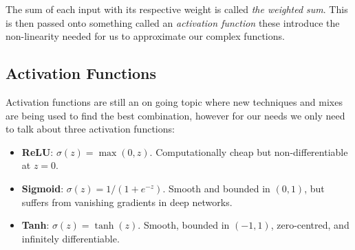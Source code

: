 \documentclass[12pt, a4paper]{article}
\begin{document}
The sum of each input with its respective weight is called \emph{the weighted sum}. This is then passed onto something called an \emph{activation function} these introduce the non-linearity needed for us to approximate our complex functions. 

\subsection{Activation Functions}

Activation functions are still an on going topic where new techniques and mixes are being used to find  the best combination, however for our needs we only need to talk about three activation functions:

\begin{itemize}
    \item \textbf{ReLU}: $\sigma(z) = \max(0, z)$. Computationally cheap but
    non-differentiable at $z = 0$. \citep{nair2010}

    \item \textbf{Sigmoid}: $\sigma(z) = 1/(1 + e^{-z})$. Smooth and bounded
    in $(0,1)$, but suffers from vanishing gradients in deep networks.\citep{lecun1998}

    \item \textbf{Tanh}: $\sigma(z) = \tanh(z)$. Smooth, bounded in $(-1,1)$,
    zero-centred, and infinitely differentiable. \citep{lecun1998}
\end{itemize}
\end{document}
